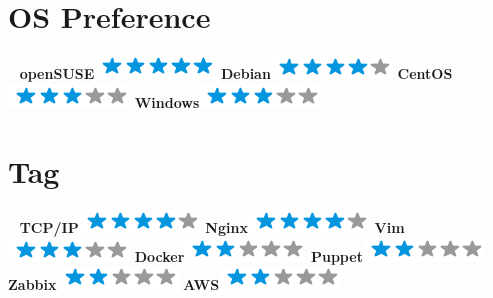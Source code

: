 \documentclass[]{friggeri-cv}
\begin{document}
\begin{aside}
  \section{OS Preference}
  ~
    \textbf{openSUSE}\includegraphics[scale=0.40]{img/5stars.png}
    \textbf{Debian}\includegraphics[scale=0.40]{img/4stars.png}
    \textbf{CentOS}\includegraphics[scale=0.40]{img/3stars.png}
    \textbf{Windows}\includegraphics[scale=0.40]{img/3stars.png}
  ~
  \section{Tag}
  ~
  \textbf{TCP/IP}\includegraphics[scale=0.40]{img/4stars.png}
  \textbf{Nginx}\includegraphics[scale=0.40]{img/4stars.png}
  \textbf{Vim}\includegraphics[scale=0.40]{img/3stars.png}
  \textbf{Docker}\includegraphics[scale=0.40]{img/2stars.png}
  \textbf{Puppet}\includegraphics[scale=0.40]{img/2stars.png}
  \textbf{Zabbix}\includegraphics[scale=0.40]{img/2stars.png}
  \textbf{AWS}\includegraphics[scale=0.40]{img/2stars.png}
  ~
\end{aside}
\end{document}
